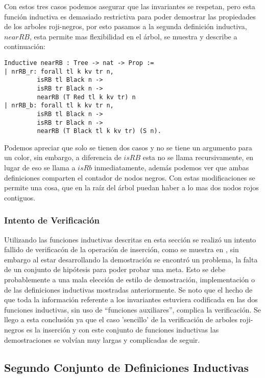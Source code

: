\documentclass[letterpaper,12pt,oneside]{book}
\newcommand{\arns}{arboles roji-negros}
\theoremstyle{plain}
\theoremstyle{definition}
\theoremstyle{remark}
\begin{document}
Con estos tres casos podemos asegurar que las invariantes se respetan, pero esta funci\'on inductiva es 
demasiado restrictiva para poder demostrar las propiedades de los {\arns}, por esto pasamos a la segunda 
definici\'on inductiva, $nearRB$,  esta permite mas flexibilidad en el \'arbol, se muestra y describe a 
continuaci\'on:

\begin{verbatim}
Inductive nearRB : Tree -> nat -> Prop :=
| nrRB_r: forall tl k kv tr n,
         isRB tl Black n ->
         isRB tr Black n ->
         nearRB (T Red tl k kv tr) n
| nrRB_b: forall tl k kv tr n,
         isRB tl Black n ->
         isRB tr Black n ->
         nearRB (T Black tl k kv tr) (S n).
\end{verbatim}
Podemos apreciar que solo se tienen dos casos y no se tiene un argumento para un color, sin embargo, a 
diferencia de $isRB$ esta no se llama recursivamente, en lugar de eso se llama a $isRb$ inmediatamente, 
además podemos ver que ambas definiciones comparten el contador de nodos negros.
Con estas modificaciones se permite una cosa, que en la ra\'iz del \'arbol puedan haber a lo mas dos 
nodos rojos contiguos.

\subsubsection{Intento de Verificaci\'on}
Utilizando las funciones inductivas descritas en esta secci\'on se realiz\'o un intento fallido de 
verificac\'on de la operaci\'on de inserci\'on, como se muestra en \cite{appel}, sin embargo al estar 
desarrollando la demostraci\'on se encontró un problema, la falta de un conjunto de hipótesis para poder 
probar una meta. Esto se debe probablemente a una mala elección de estilo de demostraci\'on, 
implementaci\'on o de las definiciones inductivas mostradas anteriormente. Se noto que el hecho de que 
toda la informaci\'on referente a los invariantes estuviera codificada en las dos funciones inductivas, 
sin uso de ``funciones auxiliares'', complica la verificaci\'on. Se llego a esta conclusi\'on ya que el 
caso 'sencillo' de la verificaci\'on de {\arns} es la inserci\'on y con este conjunto de funciones 
inductivas las demostraciones se volvían muy largas y complicadas de seguir.

\subsection{Segundo Conjunto de Definiciones Inductivas}
\end{document}
